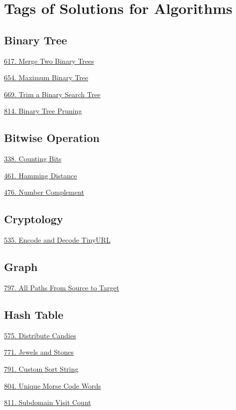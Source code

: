 \tocless\section{Tags of Solutions for Algorithms}
\label{sec:algo_tag}

\subsection*{Binary Tree}
\begin{flushleft}
    \hyperref[algo:617]{617. Merge Two Binary Trees}

    \hyperref[algo:654]{654. Maximum Binary Tree}

    \hyperref[algo:669]{669. Trim a Binary Search Tree}

    \hyperref[algo:814]{814. Binary Tree Pruning}
\end{flushleft}

\subsection*{Bitwise Operation}
\begin{flushleft}
    \hyperref[algo:338]{338. Counting Bits}

    \hyperref[algo:461]{461. Hamming Distance}

    \hyperref[algo:476]{476. Number Complement}
\end{flushleft}

\subsection*{Cryptology}
\begin{flushleft}
    \hyperref[algo:535]{535. Encode and Decode TinyURL}
\end{flushleft}

\subsection*{Graph}
\begin{flushleft}
    \hyperref[algo:797]{797. All Paths From Source to Target}
\end{flushleft}

\subsection*{Hash Table}
\begin{flushleft}
    \hyperref[algo:575]{575. Distribute Candies}

    \hyperref[algo:771]{771. Jewels and Stones}

    \hyperref[algo:791]{791. Custom Sort String}

    \hyperref[algo:804]{804. Unique Morse Code Words}

    \hyperref[algo:811]{811. Subdomain Visit Count}
\end{flushleft}

